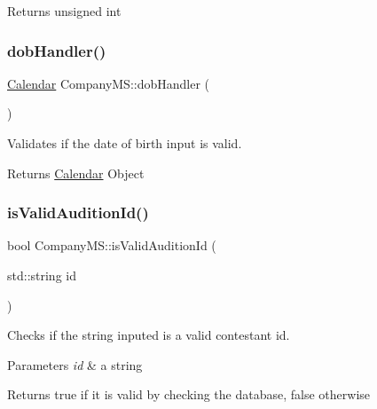 \begin{DoxyReturn}{Returns}
unsigned int 
\end{DoxyReturn}
\mbox{\label{class_company_m_s_a0018f0d192b4450e3203a581490e87ae}} 
\subsubsection{\texorpdfstring{dob\+Handler()}{dobHandler()}}
{\footnotesize\ttfamily \hyperlink{class_calendar}{Calendar} Company\+M\+S\+::dob\+Handler (\begin{DoxyParamCaption}{ }\end{DoxyParamCaption})}



Validates if the date of birth input is valid. 

\begin{DoxyReturn}{Returns}
\hyperlink{class_calendar}{Calendar} Object 
\end{DoxyReturn}
\mbox{\label{class_company_m_s_a7d66e2ba526b647b95362c1c7a7e6f48}} 
\subsubsection{\texorpdfstring{is\+Valid\+Audition\+Id()}{isValidAuditionId()}}
{\footnotesize\ttfamily bool Company\+M\+S\+::is\+Valid\+Audition\+Id (\begin{DoxyParamCaption}\item[{std\+::string}]{id }\end{DoxyParamCaption})}



Checks if the string inputed is a valid contestant id. 


\begin{DoxyParams}{Parameters}
{\em id} & a string \\
\hline
\end{DoxyParams}
\begin{DoxyReturn}{Returns}
true if it is valid by checking the database, false otherwise 
\end{DoxyReturn}
\mbox{\label{class_company_m_s_a2edd6d62bcef40920312bc967591a379}} 
